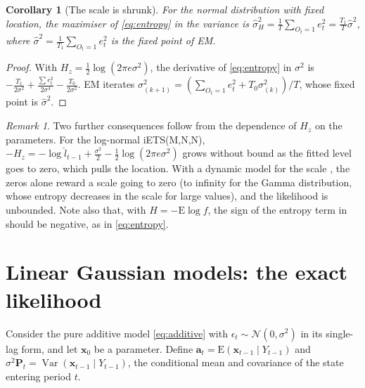 \documentclass[11pt,a4paper]{article}
\newcommand{\vect}[1]{\mathbf{#1}}
\newcommand{\E}{\mathrm{E}}
\DeclareMathOperator{\Var}{Var}
\newtheorem{corollary}{Corollary}
\theoremstyle{remark}
\newtheorem{remark}{Remark}
\begin{document}
\begin{corollary}[The scale is shrunk]
\label{cor:shrink}
For the normal distribution with fixed location, the maximiser of \eqref{eq:entropy} in the
variance is $\hat\sigma^2_H = \frac{1}{T}\sum_{O_t=1}e_t^2 = \frac{T_1}{T}\hat\sigma^2$, where
$\hat\sigma^2 = \frac{1}{T_1}\sum_{O_t=1}e_t^2$ is the fixed point of EM.
\end{corollary}

\begin{proof}
With $H_z = \frac12\log(2\pi e\sigma^2)$, the derivative of \eqref{eq:entropy} in $\sigma^2$ is
$-\frac{T_1}{2\sigma^2} + \frac{\sum e_t^2}{2\sigma^4} - \frac{T_0}{2\sigma^2}$. EM iterates
$\sigma^2_{(k+1)} = (\sum_{O_t=1}e_t^2 + T_0\sigma^2_{(k)})/T$, whose fixed point is $\hat\sigma^2$.
\end{proof}

\begin{remark}
Two further consequences follow from the dependence of $H_z$ on the parameters. For the log-normal
iETS(M,N,N), $-H_z = -\log\hat l_{t-1} + \frac{\sigma^2}{2} - \frac12\log(2\pi e\sigma^2)$ grows
without bound as the fitted level goes to zero, which pulls the location. With a dynamic model for
the scale \citep{ADAM}, the zeros alone reward a scale going to zero (to infinity for
the Gamma distribution, whose entropy decreases in the scale for large values), and the likelihood
is unbounded. Note also that, with $H = -\E\log f$, the sign of the entropy term in
\citet[eqs.~29 and B.6]{iETS} should be negative, as in \eqref{eq:entropy}.
\end{remark}

\section{Linear Gaussian models: the exact likelihood}
\label{sec:linear}

Consider the pure additive model \eqref{eq:additive} with $\epsilon_t\sim\mathcal N(0,\sigma^2)$ in
its single-lag form, and let $\vect x_0$ be a parameter. Define $\vect a_t = \E(\vect x_{t-1}\mid
Y_{t-1})$ and $\sigma^2\vect P_t = \Var(\vect x_{t-1}\mid Y_{t-1})$, the conditional mean and
covariance of the state entering period $t$.
\end{document}
